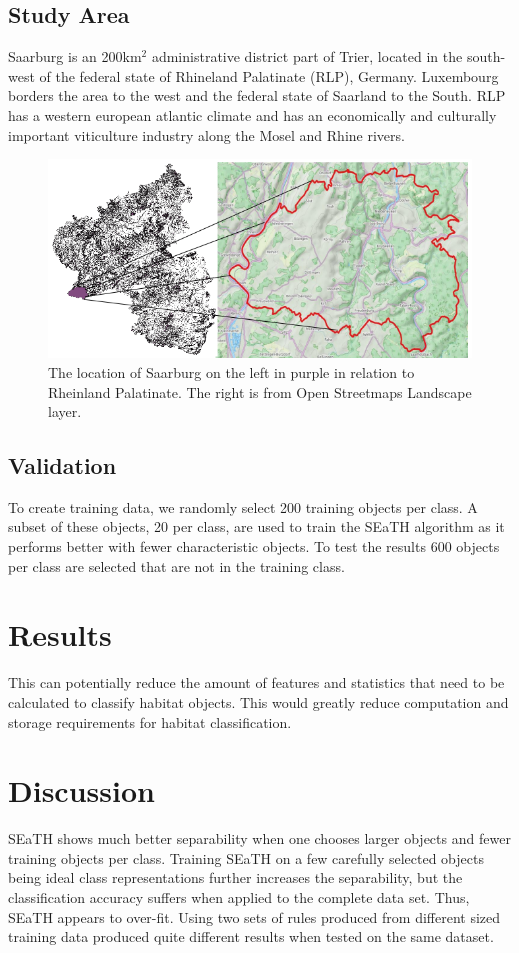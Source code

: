 \documentclass[authoryear, review,12pt,number]{elsarticle}
\begin{document}
\subsection{Study Area}
Saarburg is an 200km$^{2}$ administrative district part of Trier, located in the
south-west of the federal state of Rhineland Palatinate (RLP), Germany.
Luxembourg borders the area to the west and the federal state of Saarland to the South.
RLP has a western european atlantic climate and has an
economically and culturally important viticulture industry along the Mosel and
Rhine rivers.
\begin{figure}
	\includegraphics[width=\textwidth]{diagrams/study_area_closeup.png}
	\caption{The location of Saarburg on the left in purple in relation to 
Rheinland Palatinate. The right is from Open Streetmaps Landscape layer. }
\end{figure}

\subsection{Validation}
To create training data, we randomly select 200 training objects per class. A
subset of these objects, 20 per class, are used to train the SEaTH
algorithm as it performs better with fewer characteristic objects. To test the 
results 600 objects per class are selected that are not in the training class.

\section{Results}
This can potentially reduce the amount of features
and statistics that need to be calculated to classify habitat objects. This
would greatly reduce computation and storage requirements for habitat
classification.
\section{Discussion}
SEaTH shows much better separability when one chooses larger objects and fewer
training objects per class. Training SEaTH on a few carefully selected objects
being ideal class representations further increases the separability, but the classification
accuracy suffers when applied to the complete data set. Thus, SEaTH appears to
over-fit. Using two sets of rules produced from different sized training data
produced quite different results when tested on the same dataset.
\end{document}
